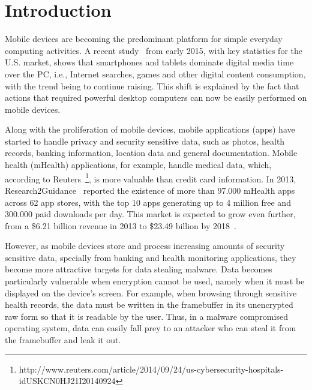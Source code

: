 
% 
% 
\section{Introduction}



Mobile devices are becoming the predominant platform for simple everyday computing activities.  A recent study~\cite{comscore} from early 2015, with key statistics for the U.S. market, shows that smartphones and tablets dominate digital media time over the \ac{PC}, i.e., Internet searches, games and other digital content consumption, with the trend being to continue raising. This shift is explained by the fact that actions that required powerful desktop computers can now be easily performed on mobile devices.

Along with the proliferation of mobile devices, mobile applications (apps) have started to handle privacy and security sensitive data, such as photos, health records, banking information, location data and general documentation. Mobile health (mHealth) applications, for example, handle medical data, which, according to Reuters~\footnote{http://www.reuters.com/article/2014/09/24/us-cybersecurity-hospitals-idUSKCN0HJ21I20140924}, is more valuable than credit card information. In 2013, Research2Guidance~\cite{research2guidance} reported the existence of more than 97.000 mHealth apps across 62 app stores, with the top 10 apps generating up to 4 million free and 300.000 paid downloads per day. This market is expected to grow even further, from a \$6.21 billion revenue in 2013 to \$23.49 billion by 2018~\cite{marketsandmarkets}.

However, as mobile devices store and process increasing amounts of security sensitive data, specially from banking and health monitoring applications, they become more attractive targets for data stealing malware. Data becomes particularly vulnerable when encryption cannot be used, namely when it must be displayed on the device's screen. For example, when browsing through sensitive health records, the data must be written in the framebuffer in its unencrypted raw form so that it is readable by the user. Thus, in a malware compromised operating system, data can easily fall prey to an attacker who can steal it from the framebuffer and leak it out.

